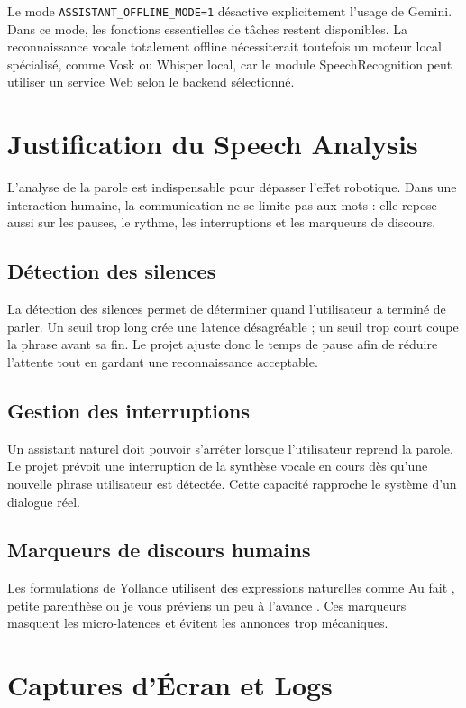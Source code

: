 \documentclass[12pt,a4paper]{report}
\begin{document}
Le mode \texttt{ASSISTANT\_OFFLINE\_MODE=1} désactive explicitement l'usage de
Gemini. Dans ce mode, les fonctions essentielles de tâches restent disponibles.
La reconnaissance vocale totalement offline nécessiterait toutefois un moteur
local spécialisé, comme Vosk ou Whisper local, car le module SpeechRecognition
peut utiliser un service Web selon le backend sélectionné.

\chapter{Justification du Speech Analysis}

L'analyse de la parole est indispensable pour dépasser l'effet robotique. Dans
une interaction humaine, la communication ne se limite pas aux mots : elle
repose aussi sur les pauses, le rythme, les interruptions et les marqueurs de
discours.

\section{Détection des silences}

La détection des silences permet de déterminer quand l'utilisateur a terminé de
parler. Un seuil trop long crée une latence désagréable ; un seuil trop court
coupe la phrase avant sa fin. Le projet ajuste donc le temps de pause afin de
réduire l'attente tout en gardant une reconnaissance acceptable.

\section{Gestion des interruptions}

Un assistant naturel doit pouvoir s'arrêter lorsque l'utilisateur reprend la
parole. Le projet prévoit une interruption de la synthèse vocale en cours dès
qu'une nouvelle phrase utilisateur est détectée. Cette capacité rapproche le
système d'un dialogue réel.

\section{Marqueurs de discours humains}

Les formulations de Yollande utilisent des expressions naturelles comme
\og Au fait \fg{}, \og petite parenthèse \fg{} ou \og je vous préviens un peu
à l'avance \fg{}. Ces marqueurs masquent les micro-latences et évitent les
annonces trop mécaniques.

\chapter{Captures d'Écran et Logs}
\end{document}
